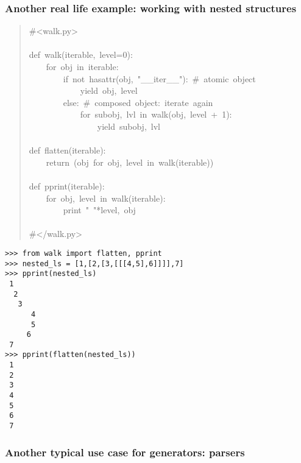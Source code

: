 \documentclass[10pt,a4paper,english]{article}
\begin{document}
\subsubsection*{Another real life example: working with nested structures}
\begin{quote}{\ttfamily \raggedright \noindent
{\#}<walk.py>~\\
~\\
def~walk(iterable,~level=0):~\\
~~~~for~obj~in~iterable:~\\
~~~~~~~~if~not~hasattr(obj,~"{\_}{\_}iter{\_}{\_}"):~{\#}~atomic~object~\\
~~~~~~~~~~~~yield~obj,~level~\\
~~~~~~~~else:~{\#}~composed~object:~iterate~again~\\
~~~~~~~~~~~~for~subobj,~lvl~in~walk(obj,~level~+~1):~\\
~~~~~~~~~~~~~~~~yield~subobj,~lvl~\\
~\\
def~flatten(iterable):~\\
~~~~return~(obj~for~obj,~level~in~walk(iterable))~\\
~~~~~~~~\\
def~pprint(iterable):~\\
~~~~for~obj,~level~in~walk(iterable):~\\
~~~~~~~~print~"~"*level,~obj~\\
~~~~~~~~\\
{\#}</walk.py>
}\end{quote}
\begin{verbatim}>>> from walk import flatten, pprint
>>> nested_ls = [1,[2,[3,[[[4,5],6]]]],7]
>>> pprint(nested_ls)     
 1
  2
   3
      4
      5
     6
 7
>>> pprint(flatten(nested_ls))
 1
 2
 3
 4
 5
 6
 7\end{verbatim}



\hypertarget{another-typical-use-case-for-generators-parsers}{}
\subsubsection*{Another typical use case for generators: parsers}
\end{document}
